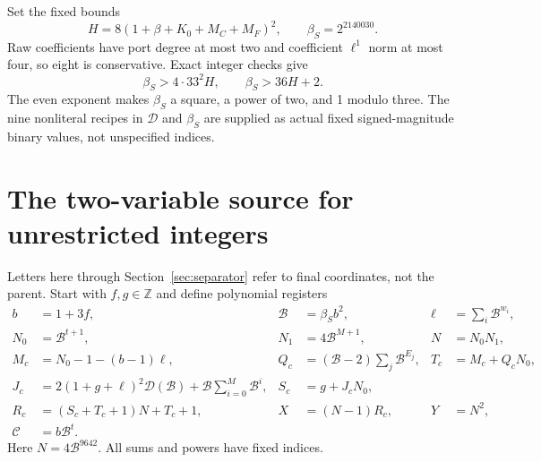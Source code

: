 \documentclass[11pt,letterpaper]{article}
\theoremstyle{remark}\newtheorem{remark}[theorem]{Remark}
\newcommand{\Z}{\mathbb Z}\newcommand{\N}{\mathbb N}
\begin{document}
Set the fixed bounds
\[
H=8(1+\beta+K_0+M_C+M_F)^2,\qquad\beta_S=2^{2140030}.
\]
Raw coefficients have port degree at most two and coefficient
$\ell^1$ norm at most four, so eight is conservative. Exact integer checks give
\begin{equation}\label{eq:basebound}
\beta_S>4\cdot33^2H,\qquad\beta_S>36H+2.
\end{equation}
The even exponent makes $\beta_S$ a square, a power of two, and 1 modulo
three. The nine nonliteral recipes in $\mathcal D$ and $\beta_S$ are
supplied as actual fixed signed-magnitude binary values, not unspecified indices.

\section{The two-variable source for unrestricted integers}\label{sec:source10}
Letters here through Section~\ref{sec:separator} refer to final coordinates,
not the parent. Start with $f,g\in\Z$ and define polynomial registers
\begin{align}
b&=1+3f,&\mathcal B&=\beta_Sb^2,&\ell&=\sum_i\mathcal B^{w_i},\nonumber\\
N_0&=\mathcal B^{t+1},&N_1&=4\mathcal B^{M+1},&N&=N_0N_1,\label{eq:sourcea}\\
M_c&=N_0-1-(b-1)\ell,&Q_c&=(\mathcal B-2)\sum_j\mathcal B^{E_j},
&T_c&=M_c+Q_cN_0,\nonumber\\
J_c&=2(1+g+\ell)^2\mathcal D(\mathcal B)
+\mathcal B\sum_{i=0}^M\mathcal B^i,
&S_c&=g+J_cN_0,\label{eq:sourceb}\\
R_c&=(S_c+T_c+1)N+T_c+1,&X&=(N-1)R_c,&Y&=N^2,\nonumber\\
\mathscr C&=b\mathcal B^t.&&&&\label{eq:sourcec}
\end{align}
Here $N=4\mathcal B^{9642}$. All sums and powers have fixed indices.
\end{document}
